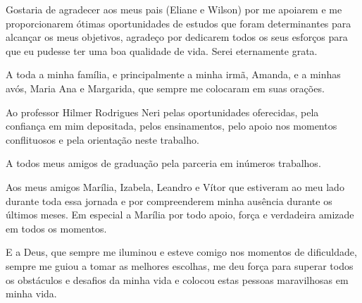 \begin{agradecimentos}

Gostaria de agradecer aos meus pais (Eliane e Wilson) por me apoiarem e me proporcionarem ótimas oportunidades
de estudos que foram determinantes para alcançar os meus objetivos,  agradeço por dedicarem todos os seus esforços para que eu pudesse ter uma boa qualidade de vida.
Serei eternamente grata.

A toda a minha família, e principalmente a minha irmã, Amanda, e a minhas avós, Maria Ana e Margarida, que sempre me colocaram em suas orações.

Ao professor Hilmer Rodrigues Neri pelas oportunidades oferecidas, pela confiança em mim depositada, pelos ensinamentos, pelo apoio nos momentos conflituosos e pela orientação neste trabalho.

A todos meus amigos de graduação pela parceria em inúmeros trabalhos.

Aos meus amigos Marília, Izabela, Leandro e Vítor que estiveram ao meu lado durante toda essa jornada e por compreenderem minha ausência durante os últimos meses. Em especial a Marília por todo apoio, força e verdadeira amizade em todos os momentos.

E a Deus, que sempre me iluminou e esteve comigo nos momentos de dificuldade, sempre me guiou a tomar as melhores escolhas, me deu força para superar todos os obstáculos e 
desafios da minha vida e colocou estas pessoas maravilhosas em minha vida.

\end{agradecimentos}
